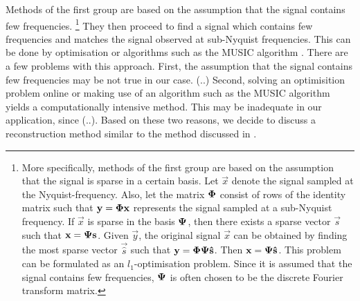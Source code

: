 \documentclass[a4paper, openany, oneside]{memoir}
\begin{document}
Methods of the first group are based on the assumption that the signal contains few frequencies.%
\footnote{More specifically, methods of the first group are based on the assumption that the signal is sparse in a certain basis. Let $\vec{x}$ denote the signal sampled at the Nyquist-frequency. Also, let the matrix $\boldsymbol{\mathbf{\Phi}}$ consist of rows of the identity matrix such that $\boldsymbol{\mathbf{y}}=\boldsymbol{\mathbf{\Phi}}\boldsymbol{\mathbf{x}}$ represents the signal sampled at a sub-Nyquist frequency. If $\vec{x}$ is sparse in the basis $\boldsymbol{\mathbf{\Psi}}$, then there exists a sparse vector $\vec{s}$ such that $\boldsymbol{\mathbf{x}}=\boldsymbol{\mathbf{\Psi}}\boldsymbol{\mathbf{s}}$. Given $\vec{y}$, the original signal $\vec{x}$ can be obtained by finding the most sparse vector $\vec{\hat{s}}$ such that $\boldsymbol{\mathbf{y}}=\boldsymbol{\mathbf{\Phi}}\boldsymbol{\mathbf{\Psi}}\boldsymbol{\mathbf{\hat{s}}}$. Then $\boldsymbol{\mathbf{x}} = \boldsymbol{\mathbf{\Psi}}\boldsymbol{\mathbf{\hat{s}}}$. This problem can be formulated as an $l_1$-optimisation problem. Since it is assumed that the signal contains few frequencies, $\boldsymbol{\mathbf{\Psi}}$ is often chosen to be the discrete Fourier transform matrix.}
They then proceed to find a signal which contains few frequencies and matches the signal observed at sub-Nyquist frequencies. This can be done by optimisation or algorithms such as the MUSIC algorithm \cite{pal2011coprime}. There are a few problems with this approach. First, the assumption that the signal contains few frequencies may be not true in our case. (..) Second, solving an optimisition problem online or making use of an algorithm such as the MUSIC algorithm yields a computationally intensive method. This may be inadequate in our application, since (..). Based on these two reasons, we decide to discuss a reconstruction method similar to the method discussed in \cite{ariananda2012compressive}.
\end{document}
